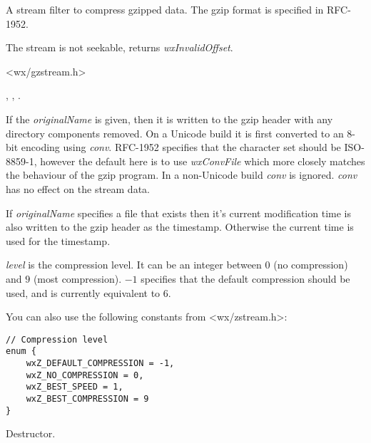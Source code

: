 A stream filter to compress gzipped data. The gzip format is specified in
RFC-1952.

The stream is not seekable,  returns 
 {\it wxInvalidOffset}.





<wx/gzstream.h>


, 
 ,
 .



\label{wxgzipoutputstreamwxgzipoutputstream}


If the {\it originalName} is given, then it is written to the gzip header
with any directory components removed. On a Unicode build it is first
converted to an 8-bit encoding using {\it conv}. RFC-1952 specifies that
the character set should be ISO-8859-1, however the default here is to
use {\it wxConvFile} which more closely matches the behaviour of the gzip
program. In a non-Unicode build {\it conv} is ignored. {\it conv} has no
effect on the stream data.

If {\it originalName} specifies a file that exists then it's current
modification time is also written to the gzip header as the timestamp.
Otherwise the current time is used for the timestamp.

{\it level} is the compression level. It can be an integer between $0$ (no
compression) and $9$ (most compression). $-1$ specifies that the default
compression should be used, and is currently equivalent to $6$.

You can also use the following constants from <wx/zstream.h>:

\begin{verbatim}
// Compression level
enum {
    wxZ_DEFAULT_COMPRESSION = -1,
    wxZ_NO_COMPRESSION = 0,
    wxZ_BEST_SPEED = 1,
    wxZ_BEST_COMPRESSION = 9
}
\end{verbatim}


\label{wxgzipoutputstreamdtor}


Destructor.

